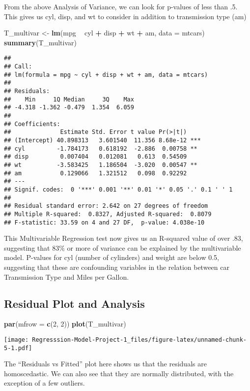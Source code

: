 \documentclass[
]{article}
\newenvironment{Shaded}{\begin{snugshade}}{\end{snugshade}}
\newcommand{\DataTypeTok}[1]{\textcolor[rgb]{0.13,0.29,0.53}{#1}}
\newcommand{\DecValTok}[1]{\textcolor[rgb]{0.00,0.00,0.81}{#1}}
\newcommand{\KeywordTok}[1]{\textcolor[rgb]{0.13,0.29,0.53}{\textbf{#1}}}
\newcommand{\NormalTok}[1]{#1}
\newcommand{\OperatorTok}[1]{\textcolor[rgb]{0.81,0.36,0.00}{\textbf{#1}}}
\newcommand{\StringTok}[1]{\textcolor[rgb]{0.31,0.60,0.02}{#1}}
\begin{document}
From the above Analysis of Variance, we can look for p-values of less
than .5. This gives us cyl, disp, and wt to consider in addition to
transmission type (am)

\begin{Shaded}
\begin{Highlighting}[]
\NormalTok{T_multivar <-}\StringTok{ }\KeywordTok{lm}\NormalTok{(mpg }\OperatorTok{~}\StringTok{ }\NormalTok{cyl }\OperatorTok{+}\StringTok{ }\NormalTok{disp }\OperatorTok{+}\StringTok{ }\NormalTok{wt }\OperatorTok{+}\StringTok{ }\NormalTok{am, }\DataTypeTok{data =}\NormalTok{ mtcars)}
\KeywordTok{summary}\NormalTok{(T_multivar)}
\end{Highlighting}
\end{Shaded}

\begin{verbatim}
## 
## Call:
## lm(formula = mpg ~ cyl + disp + wt + am, data = mtcars)
## 
## Residuals:
##    Min     1Q Median     3Q    Max 
## -4.318 -1.362 -0.479  1.354  6.059 
## 
## Coefficients:
##              Estimate Std. Error t value Pr(>|t|)    
## (Intercept) 40.898313   3.601540  11.356 8.68e-12 ***
## cyl         -1.784173   0.618192  -2.886  0.00758 ** 
## disp         0.007404   0.012081   0.613  0.54509    
## wt          -3.583425   1.186504  -3.020  0.00547 ** 
## am           0.129066   1.321512   0.098  0.92292    
## ---
## Signif. codes:  0 '***' 0.001 '**' 0.01 '*' 0.05 '.' 0.1 ' ' 1
## 
## Residual standard error: 2.642 on 27 degrees of freedom
## Multiple R-squared:  0.8327, Adjusted R-squared:  0.8079 
## F-statistic: 33.59 on 4 and 27 DF,  p-value: 4.038e-10
\end{verbatim}

This Multivariable Regression test now gives us an R-squared value of
over .83, suggesting that 83\% or more of variance can be explained by
the multivariable model. P-values for cyl (number of cylinders) and
weight are below 0.5, suggesting that these are confounding variables in
the relation between car Transmission Type and Miles per Gallon.

\hypertarget{residual-plot-and-analysis}{%
\subsection{Residual Plot and
Analysis}\label{residual-plot-and-analysis}}

\begin{Shaded}
\begin{Highlighting}[]
\KeywordTok{par}\NormalTok{(}\DataTypeTok{mfrow =} \KeywordTok{c}\NormalTok{(}\DecValTok{2}\NormalTok{, }\DecValTok{2}\NormalTok{))}
\KeywordTok{plot}\NormalTok{(T_multivar)}
\end{Highlighting}
\end{Shaded}

\texttt{[image: Regresssion-Model-Project-1\_files/figure-latex/unnamed-chunk-5-1.pdf]}

The ``Residuals vs Fitted'' plot here shows us that the residuals are
homoscedastic. We can also see that they are normally distributed, with
the exception of a few outliers.
\end{document}
